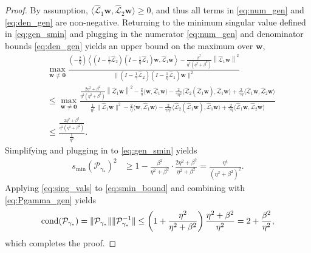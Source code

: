\documentclass[review]{siamart}
\begin{document}
\begin{proof}
By assumption, $\langle\widehat{\mathcal{L}}_1\mathbf{w},\widehat{\mathcal{L}}_2\mathbf{w}\rangle\geq 0$,
and thus all terms in \eqref{eq:num_gen} and \eqref{eq:den_gen} are non-negative.
Returning to the minimum singular value defined in \eqref{eq:gen_smin} and plugging in
the numerator \eqref{eq:num_gen} and denominator bounds \eqref{eq:den_gen} yields
an upper bound on the maximum over $\mathbf{w}$,
%
{\small
\begin{align}\label{eq:max_bound0}
&\max_{\mathbf{w}\neq\mathbf{0}}
	\frac{(-\tfrac{2}{\eta})\left\langle(I - \tfrac{1}{\gamma}\widehat{\mathcal{L}}_2)(I -
		\tfrac{1}{\eta}\widehat{\mathcal{L}}_1)\mathbf{w},
		\widehat{\mathcal{L}}_1\mathbf{w} \right\rangle- 
		\frac{\beta^2}{\eta^2(\eta^2+\beta^2)}\left\|\widehat{\mathcal{L}}_1\mathbf{w} \right\|^2}
	{\|(I - \tfrac{1}{\gamma}\widehat{\mathcal{L}}_2)(I - \tfrac{1}{\eta}\widehat{\mathcal{L}}_1)\mathbf{w}\|^2} \\
& \leq \max_{\mathbf{w}\neq\mathbf{0}}\frac{\frac{2\eta^2+\beta^2}{\eta^2(\eta^2+\beta^2)}
			\left\|\widehat{\mathcal{L}}_1\mathbf{w} \right\|^2
		- \frac{2}{\eta}\langle\mathbf{w},\widehat{\mathcal{L}}_1\mathbf{w}\rangle
		- \frac{2}{\gamma\eta^2}\langle\widehat{\mathcal{L}}_2(\widehat{\mathcal{L}}_1\mathbf{w}),
			\widehat{\mathcal{L}}_1\mathbf{w}\rangle
		+ \frac{2}{\gamma\eta}\langle\widehat{\mathcal{L}}_1\mathbf{w},\widehat{\mathcal{L}}_2\mathbf{w}\rangle}
	{\frac{1}{\eta^2}\|\widehat{\mathcal{L}}_1\mathbf{w}\|^2
	- \frac{2}{\eta}\langle \mathbf{w}, \widehat{\mathcal{L}}_1\mathbf{w}\rangle 
	- \frac{2}{\gamma\eta^2}\langle \widehat{\mathcal{L}}_2(\widehat{\mathcal{L}}_1\mathbf{w}),
		\widehat{\mathcal{L}}_1\mathbf{w}\rangle
	+ \frac{2}{\gamma\eta}\langle\widehat{\mathcal{L}}_1\mathbf{w},\widehat{\mathcal{L}}_2\mathbf{w}\rangle} \nonumber\\
& \leq \frac{\frac{2\eta^2+\beta^2}{\eta^2(\eta^2+\beta^2)}}{\frac{1}{\eta^2}}.\label{eq:max_bound}
\end{align}
}
%
Simplifying and plugging in to \eqref{eq:gen_smin} yields
%
\begin{align}\label{eq:smin_bound}
s_{\min}(\mathcal{P}_{\gamma_*})^2 &\geq 1 - \frac{\beta^2}{\eta^2+\beta^2} \cdot
	\frac{2\eta^2 + \beta^2}{\eta^2+\beta^2}
= \frac{\eta^4}{(\eta^2+\beta^2)^2}.
\end{align}
%
Applying \eqref{eq:sing_vals} to \eqref{eq:smin_bound} and
combining with \eqref{eq:Pgamma_gen} yields
%
\begin{align}
\textnormal{cond}(\mathcal{P}_{\gamma_*}) = \|\mathcal{P}_{\gamma_*}\|\|\mathcal{P}_{\gamma_*}^{-1}\|
	\leq \left(1+\frac{\eta^2}{\eta^2+\beta^2}\right)\frac{\eta^2+\beta^2}{\eta^2}
	= 2+\frac{\beta^2}{\eta^2},
\end{align}
%
which completes the proof.
\end{proof}
%
\end{document}
